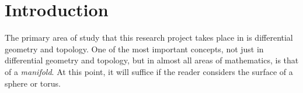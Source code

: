 \documentclass[12pt,a4paper]{article}
\numberwithin{equation}{section}
\theoremstyle{definition}
\theoremstyle{remark}
\begin{document}
%
\thispagestyle{empty}
\nocite{*}
\pagebreak
\tableofcontents
\pagebreak

\section{Introduction}
The primary area of study that this research project takes place in is differential geometry and topology. One of the most important concepts, not just in differential geometry and topology, but in almost all areas of mathematics, is that of a \textit{manifold}. At this point, it will suffice if the reader considers the surface of a sphere or torus.\\
\end{document}
